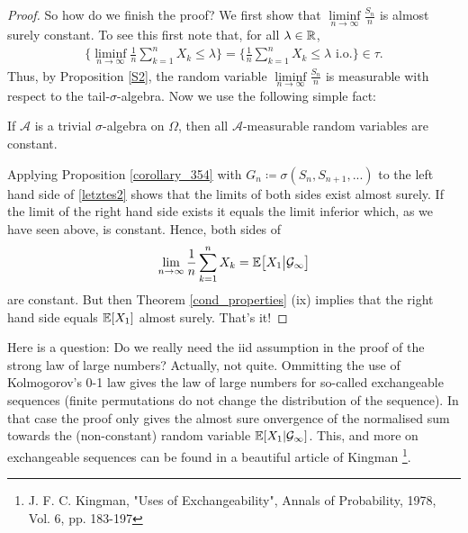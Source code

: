\begin{proof}[Proof]
			So how do we finish the proof? We first show that $\liminf\limits_{n\to\infty}\frac{S_n}{n}$ is almost surely constant. To see this first note that, for all $\lambda\in \mathbb{R}$,
			\begin{align*}
				\Big\{ \liminf\limits_{n\to\infty}\frac{1}{n}\sum\limits_{k=1}^{n}X_k \leq \lambda \Big\} = \Big\{ \frac{1}{n}\sum\limits_{k=1}^{n}X_k \leq \lambda \text{ i.o.}\Big\} \in \tau.
			\end{align*}
			Thus, by Proposition \ref{S2}, the random variable $\liminf\limits_{n\to\infty}\frac{S_n}{n}$ is measurable with respect to the tail-$\sigma$-algebra. Now we use the following simple fact:
			\begin{luebung}
				If $\mathcal A$ is a trivial $\sigma$-algebra on $\Omega$, then all $\mathcal A$-measurable random variables are constant.
			\end{luebung}




			Applying Proposition \ref{corollary_354} with $G_n \coloneqq \sigma(S_n,S_{n+1},...)$ to the left hand side of \eqref{letztes2} shows that the limits of both sides exist almost surely. If the limit of the right hand side exists it equals the limit inferior which, as we have seen above, is constant. Hence, both sides of
			\begin{align*}
				\lim\limits_{n\to\infty}\frac{1}{n}\sum\limits_{k=1}^{n}X_k = \mathbb{E} \big[ X_1\big | \mathcal{G}_\infty\big]
			\end{align*}
			are constant. But then Theorem \ref{cond_properties} (ix) implies that the right hand side equals $\mathbb{E}[X_1]$ almost surely. That's it!
\end{proof}
Here is a question: Do we really need the iid assumption in the proof of the strong law of large numbers? Actually, not quite. Ommitting the use of Kolmogorov's 0-1 law gives the law of large numbers for so-called exchangeable sequences (finite permutations do not change the distribution of the sequence). In that case the proof only gives the almost sure onvergence of the normalised sum towards the (non-constant) random variable $\mathbb{E}[X_1|\mathcal G_\infty]$. This, and more on exchangeable sequences can be found in a beautiful article of Kingman \footnote{J. F. C. Kingman, "{}Uses of Exchangeability", Annals of Probability, 1978,
Vol. 6, pp. 183-197}.



